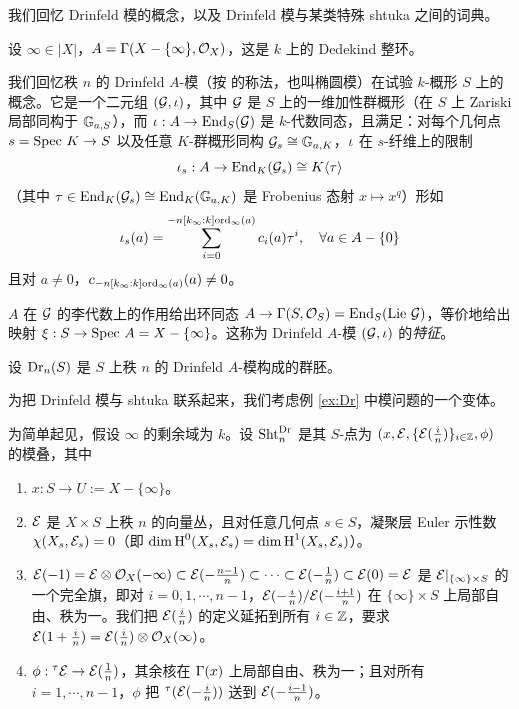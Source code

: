我们回忆 Drinfeld 模的概念，以及 Drinfeld 模与某类特殊 shtuka 之间的词典。

设 $\infty\in |X|$，$A=\Gamma(X-\{\infty\}, \mathcal{O}_{X})$，这是 $k$ 上的 Dedekind 整环。

我们回忆秩 $n$ 的 Drinfeld $A$-模（按 \cite{Dr-Ell} 的称法，也叫椭圆模）在试验 $k$-概形 $S$ 上的概念。它是一个二元组 $(\mathcal{G}, \iota)$，其中 $\mathcal{G}$ 是 $S$ 上的一维加性群概形（在 $S$ 上 Zariski 局部同构于 $\mathbb{G}_{a,S}$），而 $\iota: A\to \textup{End}_{S}(\mathcal{G})$ 是 $k$-代数同态，且满足：对每个几何点 $s=\textup{Spec}\  K \to S$ 以及任意 $K$-群概形同构 $\mathcal{G}_{s}\cong\mathbb{G}_{a,K}$，$\iota$ 在 $s$-纤维上的限制
\begin{equation*}
\iota_{s}: A\to \textup{End}_{K}(\mathcal{G}_{s})\cong K\langle{\tau}\rangle
\end{equation*}
（其中 $\tau\in \textup{End}_{K}(\mathcal{G}_{s})\cong\textup{End}_{K}(\mathbb{G}_{a,K})$ 是 Frobenius 态射 $x\mapsto x^{q}$）形如
\begin{equation*}
\iota_{s}(a)=\sum_{i=0}^{-n[k_{\infty}:k]\mathrm{ord}_{\infty}(a)}c_{i}(a)\tau^{i}, \quad \forall a\in A-\{0\}
\end{equation*}
且对 $a\ne0$，$c_{-n[k_{\infty}:k]\mathrm{ord}_{\infty}(a)}(a)\ne0$。

$A$ 在 $\mathcal{G}$ 的李代数上的作用给出环同态 $A\to \Gamma(S,\mathcal{O}_{S})=\textup{End}_{S}(\textup{Lie}\ \mathcal{G})$，等价地给出映射 $\xi: S\to \textup{Spec}\  A=X-\{\infty\}$。这称为 Drinfeld $A$-模 $(\mathcal{G},\iota)$ 的\emph{特征}。

设 $\mathrm{Dr}_{n}(S)$ 是 $S$ 上秩 $n$ 的 Drinfeld $A$-模构成的群胚。

\label{sss:one leg}
为把 Drinfeld 模与 shtuka 联系起来，我们考虑例 \ref{ex:Dr} 中模问题的一个变体。

为简单起见，假设 $\infty$ 的剩余域为 $k$。设 $\textup{Sht}_{n}^{\mathrm{Dr}}$ 是其 $S$-点为 $(x, \mathcal{E}, \{\mathcal{E}(\frac{i}{n})\}_{i\in \mathbb{Z}}, \phi)$ 的模叠，其中
\begin{enumerate}
\item $x: S\to U:=X-\{\infty\}$。
\item $\mathcal{E}$ 是 $X\times S$ 上秩 $n$ 的向量丛，且对任意几何点 $s\in S$，凝聚层 Euler 示性数 $\chi(X_{s}, \mathcal{E}_{s})=0$（即 $\dim \textup{H}^{0}(X_{s},\mathcal{E}_{s})=\dim\textup{H}^{1}(X_{s},\mathcal{E}_{s})$）。
\item $\mathcal{E}(-1)=\mathcal{E}\otimes\mathcal{O}_{X}(-\infty)\subset \mathcal{E}(-\frac{n-1}{n})\subset\cdots\subset \mathcal{E}(-\frac{1}{n})\subset \mathcal{E}(0)=\mathcal{E}$ 是 $\mathcal{E}|_{\{\infty\}\times S}$ 的一个完全旗，即对 $i=0,1,\cdots, n-1$，$\mathcal{E}(-\frac{i}{n})/\mathcal{E}(-\frac{i+1}{n})$ 在 $\{\infty\}\times S$ 上局部自由、秩为一。我们把 $\mathcal{E}(\frac{i}{n})$ 的定义延拓到所有 $i\in \mathbb{Z}$，要求 $\mathcal{E}(1+\frac{i}{n})=\mathcal{E}(\frac{i}{n})\otimes\mathcal{O}_{X}(\infty)$。
\item $\phi: {}^{\tau}\mathcal{E}\to \mathcal{E}(\frac{1}{n})$，其余核在 $\Gamma(x)$ 上局部自由、秩为一；且对所有 $i=1,\cdots,n-1$，$\phi$ 把 ${}^{\tau}(\mathcal{E}(-\frac{i}{n}))$ 送到 $\mathcal{E}(-\frac{i-1}{n})$。
\end{enumerate}

